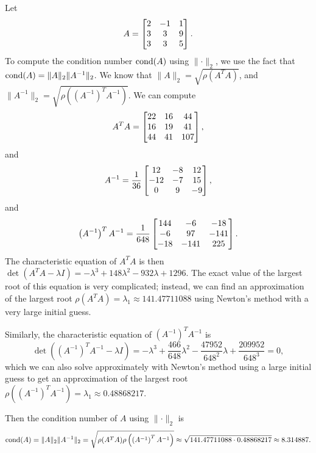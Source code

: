\documentclass[newpage]{homework}
\begin{document}
	\question Let
	\begin{equation*}
		A = \left[\begin{matrix}2 & -1 & 1 \\ 3 & 3 & 9 \\ 3 & 3 & 5\end{matrix}\right].
	\end{equation*}
	To compute the condition number $\operatorname{cond}(A)$ using $\lVert \cdot\rVert_2$, we use the fact that $\operatorname{cond}(A) = \lVert A\rVert_2 \lVert A^{-1}\rVert_2$. We know that $\lVert A \rVert_2 = \sqrt{\rho(A^TA)}$, and $\lVert A^{-1}\rVert_2 = \sqrt{\rho\left(\left(A^{-1}\right)^TA^{-1}\right)}$. We can compute
	\begin{equation*}
		A^TA = \left[\begin{matrix}22 & 16 & 44 \\ 16 & 19 & 41 \\ 44 & 41 & 107\end{matrix}\right],
	\end{equation*}
	and
	\begin{equation*}
		A^{-1} = \frac{1}{36}\left[\begin{matrix}12 & -8 & 12 \\ -12 & -7 & 15 \\ 0 & 9 & -9\end{matrix}\right],
	\end{equation*}
	and
	\begin{equation*}
		\left(A^{-1}\right)^TA^{-1} = \frac{1}{648}\left[\begin{matrix}144 & -6 & -18 \\ -6 & 97 & -141 \\ -18 & -141 & 225\end{matrix}\right].
	\end{equation*}
	The characteristic equation of $A^TA$ is then $\det(A^TA-\lambda I) = -\lambda^3 + 148\lambda^2 - 932\lambda + 1296$. The exact value of the largest root of this equation is very complicated; instead, we can find an approximation of the largest root $\rho(A^TA) = \lambda_1 \approx 141.47711088$ using Newton's method with a very large initial guess.
	
	Similarly, the characteristic equation of $\left(A^{-1}\right)^TA^{-1}$ is 
	\begin{equation*}
		\det\left(\left(A^{-1}\right)^TA^{-1} - \lambda I\right) = -\lambda^3 + \frac{466}{648}\lambda^2 - \frac{47952}{648^2}\lambda + \frac{209952}{648^3} = 0,
	\end{equation*}
	which we can also solve approximately with Newton's method using a large initial guess to get an approximation of the largest root $\rho\left(\left(A^{-1}\right)^TA^{-1}\right) = \lambda_1 \approx 0.48868217$.
	
	Then the condition number of $A$ using $\lVert \cdot \rVert_2$ is
	\begin{equation*}
		\operatorname{cond}(A) = \lVert A\rVert_2\lVert A^{-1}\rVert_2 = \sqrt{\rho(A^TA)\rho\left(\left(A^{-1}\right)^TA^{-1}\right)} \approx \sqrt{141.47711088\cdot  0.48868217} \approx 8.314887.
	\end{equation*}
	
\end{document}
